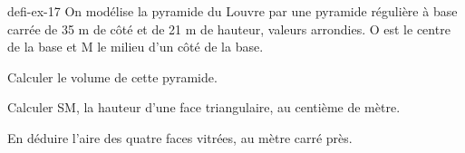 \begin{blocEdition}{defi-ex-17}
On modélise la pyramide du Louvre par une pyramide régulière à base carrée de 35 m de côté et de 21 m de hauteur, valeurs arrondies. O est le centre de la base et M le milieu d’un côté de la base.\begin{questions}\item Calculer le volume de cette pyramide.\item Calculer SM, la hauteur d’une face triangulaire, au centième de mètre.\item En déduire l’aire des quatre faces vitrées, au mètre carré près.\end{questions}\label{fig-defi-17}
\par{}\par\par{}\par{}\par{}\par{}\par{}\par{}
\end{blocEdition}
